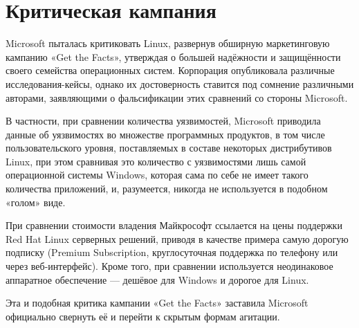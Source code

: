 \chapter*{Критическая кампания}

Microsoft пыталась критиковать Linux, развернув обширную маркетинговую кампанию «Get the Facts», утверждая о большей надёжности и защищённости своего семейства операционных систем. Корпорация опубликовала различные исследования-кейсы, однако их достоверность ставится под сомнение различными авторами, заявляющими о фальсификации этих сравнений со стороны Microsoft.

В частности, при сравнении количества уязвимостей, Microsoft приводила данные об уязвимостях во множестве программных продуктов, в том числе пользовательского уровня, поставляемых в составе некоторых дистрибутивов Linux, при этом сравнивая это количество с уязвимостями лишь самой операционной системы Windows, которая сама по себе не имеет такого количества приложений, и, разумеется, никогда не используется в подобном «голом» виде.

При сравнении стоимости владения Майкрософт ссылается на цены поддержки Red Hat Linux серверных решений, приводя в качестве примера самую дорогую подписку (Premium Subscription, круглосуточная поддержка по телефону или через веб-интерфейс). Кроме того, при сравнении используется неодинаковое аппаратное обеспечение — дешёвое для Windows и дорогое для Linux.

Эта и подобная критика кампании «Get the Facts» заставила Microsoft официально свернуть её и перейти к скрытым формам агитации.
